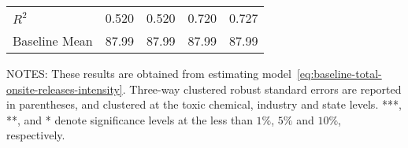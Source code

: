 \begin{table}[H]
{\begin{tabular}{@{}lllll@{}}
            $R^2$                          & 0.520     & 0.520     & 0.720     & 0.727     \\
            Baseline Mean                  & 87.99     & 87.99     & 87.99     & 87.99     \\ \bottomrule\bottomrule
        \end{tabular}%
    }
    \begin{minipage}{\columnwidth}
        \vspace{0.05in}
        NOTES: These results are obtained from estimating model~\ref{eq:baseline-total-onsite-releases-intensity}. Three-way clustered robust standard errors are reported in parentheses, and clustered at the toxic chemical, industry and state levels. ***, **, and * denote significance levels at the less than $1\%$, $5\%$ and $10\%$, respectively.
    \end{minipage}
\end{table}